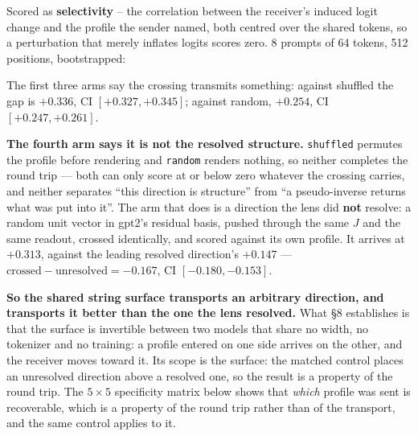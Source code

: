 \documentclass[10pt,letterpaper,twocolumn]{article}
\begin{document}
Scored as \textbf{selectivity} -- the correlation between the receiver's induced logit change and the
profile the sender named, both centred over the shared tokens, so a perturbation that merely
inflates logits scores zero. 8 prompts of 64 tokens, 512 positions, bootstrapped:


The first three arms say the crossing transmits something: against shuffled the gap is \(+0.336\),
CI \([+0.327, +0.345]\); against random, \(+0.254\), CI \([+0.247, +0.261]\).

\textbf{The fourth arm says it is not the resolved structure.} \texttt{shuffled} permutes the profile before
rendering and \texttt{random} renders nothing, so neither completes the round trip --- both can only score
at or below zero whatever the crossing carries, and neither separates ``this direction is structure''
from ``a pseudo-inverse returns what was put into it''. The arm that does is a direction the lens did
\textbf{not} resolve: a random unit vector in gpt2's residual basis, pushed through the same \(J\) and the
same readout, crossed identically, and scored against its own profile. It arrives at \(+0.313\),
against the leading resolved direction's \(+0.147\) --- \(\text{crossed}-\text{unresolved}=-0.167\), CI
\([-0.180, -0.153]\).

\textbf{So the shared string surface transports an arbitrary direction, and transports it better than the
one the lens resolved.} What §8 establishes is that the surface is invertible between two models
that share no width, no tokenizer and no training: a profile entered on one side arrives on the
other, and the receiver moves toward it. Its scope is the surface: the matched control places an
unresolved direction above a resolved one, so the result is a property of the round trip. The \(5\times5\) specificity matrix below shows that \emph{which} profile was sent is
recoverable, which is a property of the round trip rather than of the transport, and the same
control applies to it.
\end{document}
